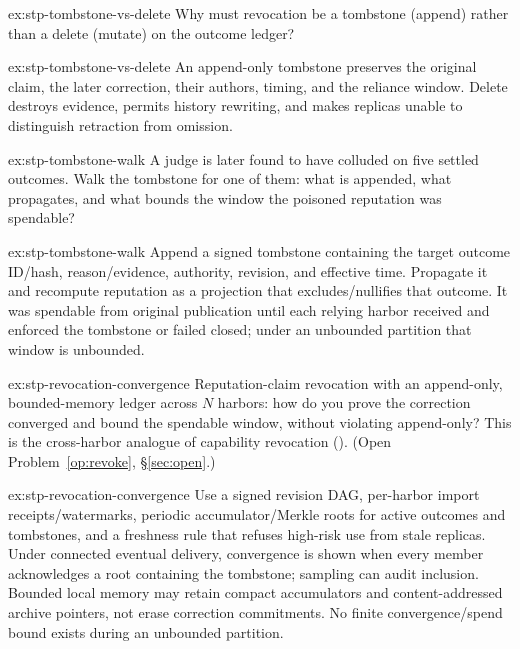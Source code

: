 \documentclass[11pt,a4paper]{article}
\theoremstyle{definition}
\begin{document}


\begin{pdexercise}[kind=Check,rating=1]{ex:stp-tombstone-vs-delete}
Why must revocation be a tombstone (append) rather than a delete (mutate) on
the outcome ledger?
\end{pdexercise}
\begin{pdsolution}{ex:stp-tombstone-vs-delete}
An append-only tombstone preserves the original claim, the later correction,
their authors, timing, and the reliance window. Delete destroys evidence,
permits history rewriting, and makes replicas unable to distinguish
retraction from omission.
\end{pdsolution}
\begin{pdexercise}[kind=Trace,rating=2]{ex:stp-tombstone-walk}
A judge is later found to have colluded on five settled outcomes. Walk the
tombstone for one of them: what is appended, what propagates, and what
bounds the window the poisoned reputation was spendable?
\end{pdexercise}
\begin{pdsolution}{ex:stp-tombstone-walk}
Append a signed tombstone containing the target outcome ID/hash,
reason/evidence, authority, revision, and effective time. Propagate it and
recompute reputation as a projection that excludes/nullifies that outcome.
It was spendable from original publication until each relying harbor
received and enforced the tombstone or failed closed; under an unbounded
partition that window is unbounded.
\end{pdsolution}
\begin{pdexercise}[kind=Open,rating=3]{ex:stp-revocation-convergence}
Reputation-claim revocation with an append-only, bounded-memory ledger across
$N$ harbors: how do you prove the correction converged and bound the
spendable window, without violating append-only? This is the cross-harbor
analogue of capability revocation (). (Open
Problem~\ref{op:revoke}, \S\ref{sec:open}.)
\end{pdexercise}
\begin{pdsolution}{ex:stp-revocation-convergence}
Use a signed revision DAG, per-harbor import receipts/watermarks, periodic
accumulator/Merkle roots for active outcomes and tombstones, and a freshness
rule that refuses high-risk use from stale replicas. Under connected
eventual delivery, convergence is shown when every member acknowledges a
root containing the tombstone; sampling can audit inclusion. Bounded local
memory may retain compact accumulators and content-addressed archive
pointers, not erase correction commitments. No finite convergence/spend
bound exists during an unbounded partition.
\end{pdsolution}
\end{document}
